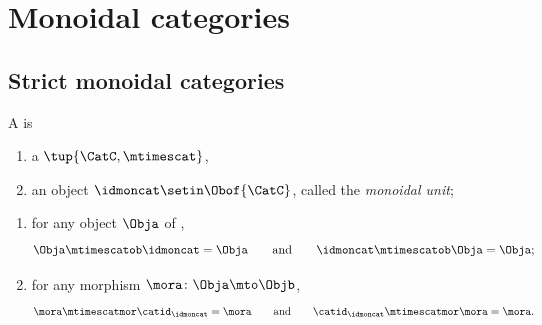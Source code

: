 
\section{Monoidal categories}\label{sec:monoidal-stacking}


\subsection{Strict monoidal categories}

\begin{ctdefinition}
    \label{def:strict-monoidal-cat}
    A  is

    \constit

    \begin{enumerate}
        \item a  $\tup{\CatC, \mtimescat}$,
        \item an object $\idmoncat \setin \Obof{\CatC}$, called the \emph{monoidal unit};
    \end{enumerate}

    \condit

    \begin{enumerate}
        \item for any object $\Obja$ of \CatC,
              \begin{equation}\label{eq:strict-mon-stacking-cat-cond1}
                  \Obja \mtimescatob \idmoncat = \Obja \qquad \text{and} \qquad \idmoncat \mtimescatob \Obja = \Obja;
              \end{equation}
        \item for any morphism $\mora \colon \Obja \mto \Objb$,
              \begin{equation}\label{eq:strict-mon-stacking-cat-cond2}
                  \mora \mtimescatmor \catid_\idmoncat = \mora \qquad \text{and} \qquad \catid_\idmoncat \mtimescatmor  \mora = \mora.
              \end{equation}
    \end{enumerate}
\end{ctdefinition}



